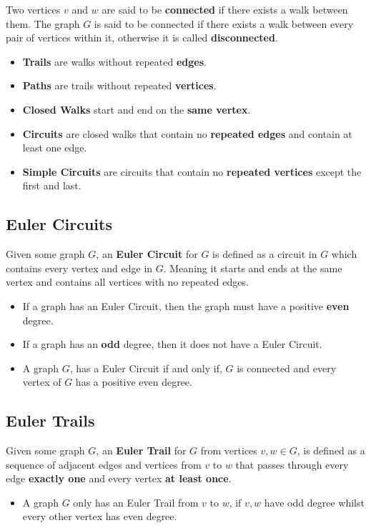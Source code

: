 \documentclass[a4paper]{article}
\begin{document}
  \noindent Two vertices $v$ and $w$ are said to be \textbf{connected} if there exists a walk between them. The graph $G$ is said to be connected if there exists a walk between every pair of vertices within it, otherwise it is called \textbf{disconnected}.
  \begin{itemize}
    \item \textbf{Trails} are walks without repeated \textbf{edges}.
    \item \textbf{Paths} are trails without repeated \textbf{vertices}.
    \item \textbf{Closed Walks} start and end on the \textbf{same vertex}.
    \item \textbf{Circuits} are closed walks that contain no \textbf{repeated edges} and contain at least one edge.
    \item \textbf{Simple Circuits} are circuits that contain no \textbf{repeated vertices} except the first and last.
  \end{itemize}
  
  \subsection{Euler Circuits}
  Given some graph $G$, an \textbf{Euler Circuit} for $G$ is defined as a circuit in $G$ which contains every vertex and edge in $G$. Meaning it starts and ends at the same vertex and contains all vertices with no repeated edges.
  \begin{itemize}
    \item If a graph has an Euler Circuit, then the graph must have a positive \textbf{even} degree.
    \item If a graph has an \textbf{odd} degree, then it does not have a Euler Circuit.
    \item A graph $G$, has a Euler Circuit if and only if, $G$ is connected and every vertex of $G$ has a positive even degree.
  \end{itemize}
  \subsection{Euler Trails}
  Given some graph $G$, an \textbf{Euler Trail} for $G$ from vertices $v,w \in G$, is defined as a sequence of adjacent edges and vertices from $v$ to $w$ that passes through every edge \textbf{exactly one} and every vertex \textbf{at least once}.
  \begin{itemize}
    \item A graph $G$ only has an Euler Trail from $v$ to $w$, if $v,w$ have odd degree whilst every other vertex has even degree.
  \end{itemize}
\end{document}
